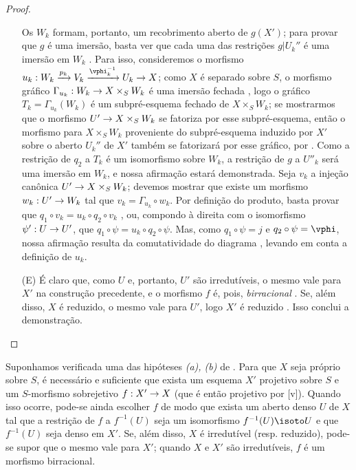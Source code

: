 \documentclass[oneside,10pt]{amsart}
\makeatletter
\newcommand{\ega@arrow}[2]{\mathchoice{#1}{#2}{#2}{#2}}
\renewcommand{\to}{\ega@arrow{\longrightarrow}{\rightarrow}}
\newcommand{\oldpage}[2][]{\marginnote{\normalfont\footnotesize\textbf{#1}~|~#2}\ignorespaces}
\let\EGAOriginalLabel\label
\renewcommand{\label}[1]{\phantomsection\EGAOriginalLabel{#1}}
\makeatother
\begin{document}
\begin{proof}
\begin{enumerate}
    Os $W_k$ formam, portanto, um recobrimento aberto de $g(X')$; para provar que $g$ é uma imersão, basta ver que cada uma das restrições $g|U_k''$ é uma imersão em $W_k$ .
    Para isso, consideremos o morfismo $u_k:W_k\xrightarrow{p_k}V_k\xrightarrow{\vphi_k^{-1}}U_k\to X$; como $X$ é separado sobre $S$, o morfismo gráfico $\Gamma_{u_k}:W_k\to X\times_S W_k$ é uma imersão fechada , logo o gráfico $T_k=\Gamma_{u_k}(W_k)$ é um subpré-esquema fechado de $X\times_S W_k$;
    se mostrarmos que o morfismo $U'\to X\times_S W_k$ se fatoriza por esse subpré-esquema, então o morfismo para $X\times_S W_k$ proveniente do subpré-esquema induzido por $X'$ sobre o aberto $U_k''$ de $X'$ também se fatorizará por esse gráfico, por .
    Como a restrição de $q_2$ a $T_k$ é um isomorfismo sobre $W_k$, a restrição de $g$ a $U''_k$ será uma imersão em $W_k$, e nossa afirmação estará demonstrada.
    Seja $v_k$ a injeção canônica $U'\to X\times_S W_k$; devemos mostrar que existe um morfismo $w_k:U'\to W_k$ tal que $v_k=\Gamma_{u_k}\circ w_k$.
    Por definição do produto, basta provar que $q_1\circ v_k=u_k\circ q_2\circ v_k$ , ou, compondo à direita
\oldpage[II]{109}
com o isomorfismo $\psi':U\to U'$, que $q_1\circ\psi=u_k\circ q_2\circ\psi$.
Mas, como $q_1\circ\psi=j$ e $q_2\circ\psi=\vphi$, nossa afirmação resulta da comutatividade do diagrama , levando em conta a definição de $u_k$.
  \item[(E)] É claro que, como $U$ e, portanto, $U'$ são irredutíveis, o mesmo vale para $X'$ na construção precedente, e o morfismo $f$ é, pois, \emph{birracional} .
    Se, além disso, $X$ é reduzido, o mesmo vale para $U'$, logo $X'$ é reduzido .
    Isso conclui a demonstração.
\end{enumerate}
\end{proof}

\begin{corollary}[5.6.2]
\label{II.5.6.2}
Suponhamos verificada uma das hipóteses \emph{(a), (b)} de .
Para que $X$ seja próprio sobre $S$, é necessário e suficiente que exista um esquema $X'$ projetivo sobre $S$ e um $S$-morfismo sobrejetivo $f:X'\to X$ (que é então projetivo por [v]).
Quando isso ocorre, pode-se ainda escolher $f$ de modo que exista um aberto denso $U$ de $X$ tal que a restrição de $f$ a $f^{-1}(U)$ seja um isomorfismo $f^{-1}(U)\isoto U$ e que $f^{-1}(U)$ seja denso em $X'$.
Se, além disso, $X$ é irredutível (resp. reduzido), pode-se supor que o mesmo vale para $X'$; quando $X$ e $X'$ são irredutíveis, $f$ é um morfismo birracional.
\end{corollary}
\end{document}
